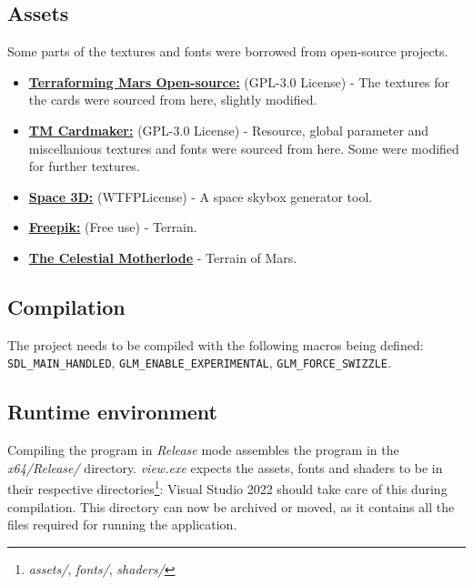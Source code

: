 \subsection{Assets}

Some parts of the textures and fonts were borrowed from open-source projects.

\begin{itemize}
    \item \href{https://github.com/terraforming-mars/terraforming-mars}{\textbf{Terraforming Mars Open-source:}} (GPL-3.0 License) - The textures for the cards were sourced from here, slightly modified.
    \item \href{https://github.com/SliceOfBread/tm_cardmaker}{\textbf{TM Cardmaker:}} (GPL-3.0 License) - Resource, global parameter and miscellanious textures and fonts were sourced from here. Some were modified for further textures.
    \item \href{https://tools.wwwtyro.net/space-3d/index.html}{\textbf{Space 3D:}} (WTFPLicense) - A space skybox generator tool.
    \item \href{https://www.freepik.com/legal/terms-of-use#nav-freepik-license}{\textbf{Freepik:}} (Free use) - Terrain.
    \item \href{http://www.celestiamotherlode.net/catalog/mars.html}{\textbf{The Celestial Motherlode}} - Terrain of Mars.
\end{itemize}

\subsection{Compilation}

The project needs to be compiled with the following macros being defined: \texttt{SDL\_MAIN\_HANDLED}, \texttt{GLM\_ENABLE\_EXPERIMENTAL}, \texttt{GLM\_FORCE\_SWIZZLE}.

\subsection{Runtime environment}

Compiling the program in \textit{Release} mode assembles the program in the \textit{x64/Release/} directory. \textit{view.exe} expects the assets, fonts and shaders to be in their respective directories\footnote{\textit{assets/}, \textit{fonts/}, \textit{shaders/}}: Visual Studio 2022 should take care of this during compilation. This directory can now be archived or moved, as it contains all the files required for running the application.


